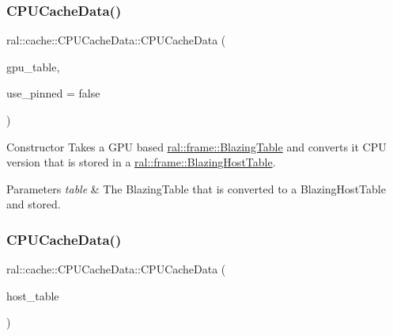 \subsubsection{\texorpdfstring{C\+P\+U\+Cache\+Data()}{CPUCacheData()}\hspace{0.1cm}{\footnotesize\ttfamily [1/2]}}
{\footnotesize\ttfamily ral\+::cache\+::\+C\+P\+U\+Cache\+Data\+::\+C\+P\+U\+Cache\+Data (\begin{DoxyParamCaption}\item[{std\+::unique\+\_\+ptr$<$ \hyperlink{classral_1_1frame_1_1BlazingTable}{ral\+::frame\+::\+Blazing\+Table} $>$}]{gpu\+\_\+table,  }\item[{bool}]{use\+\_\+pinned = {\ttfamily false} }\end{DoxyParamCaption})}

Constructor Takes a G\+PU based \hyperlink{classral_1_1frame_1_1BlazingTable}{ral\+::frame\+::\+Blazing\+Table} and converts it C\+PU version that is stored in a \hyperlink{classral_1_1frame_1_1BlazingHostTable}{ral\+::frame\+::\+Blazing\+Host\+Table}. 
\begin{DoxyParams}{Parameters}
{\em table} & The Blazing\+Table that is converted to a Blazing\+Host\+Table and stored. \\
\hline
\end{DoxyParams}
\mbox{\label{classral_1_1cache_1_1CPUCacheData_ae74c9b51edabc2aa06f8923c6f3afc5f}} 
\subsubsection{\texorpdfstring{C\+P\+U\+Cache\+Data()}{CPUCacheData()}\hspace{0.1cm}{\footnotesize\ttfamily [2/2]}}
{\footnotesize\ttfamily ral\+::cache\+::\+C\+P\+U\+Cache\+Data\+::\+C\+P\+U\+Cache\+Data (\begin{DoxyParamCaption}\item[{std\+::unique\+\_\+ptr$<$ \hyperlink{classral_1_1frame_1_1BlazingHostTable}{ral\+::frame\+::\+Blazing\+Host\+Table} $>$}]{host\+\_\+table }\end{DoxyParamCaption})}

